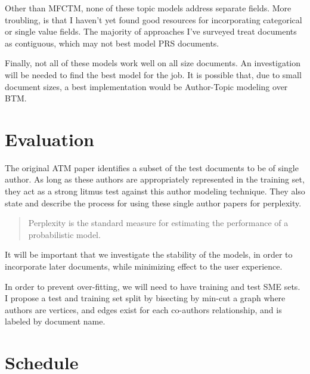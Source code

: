 \documentclass{article}
\begin{document}
\begin{multicols}{2}
Other than MFCTM\cite{Salomatin2009MultifieldCT}, none of these topic models
address separate fields. More troubling, is that I haven't yet found good resources for
incorporating categorical or single value fields. The majority of approaches I've surveyed
treat documents as contiguous, which may not best model PRS documents.

Finally, not all of these models work well on all size documents. An investigation will
be needed to find the best model for the job. It is possible that, due to small document
sizes, a best implementation would be Author-Topic modeling over BTM.

\section{Evaluation}

The original ATM paper identifies a subset of the test documents to be of single author.
As long as these authors are appropriately represented in the training set, they act as
a strong litmus test against this author modeling technique. They also state and describe
the process for using these single author papers for perplexity.
\begin{quote}
  Perplexity is the standard measure for estimating the performance of a probabilistic model.
\end{quote}

It will be important that we investigate the stability of the models\cite{Yang2016}, in order
to incorporate later documents, while minimizing effect to the user experience.

In order to prevent over-fitting, we will need to have training and test SME sets.
I propose a test and training set split by bisecting by min-cut\cite{Feige2002} a graph where
authors are vertices, and edges exist for each co-authors relationship, and is labeled by
document name.

\section{Schedule}


\end{multicols}
\end{document}
